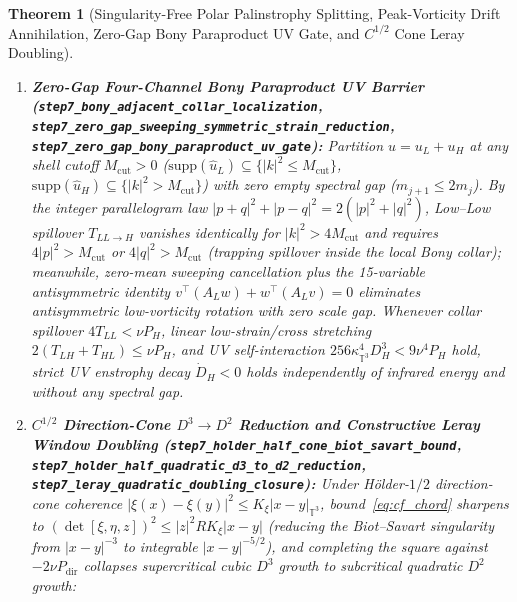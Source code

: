 \documentclass[11pt]{article}
\theoremstyle{plain}
\newtheorem{theorem}{Theorem}[section]
\theoremstyle{definition}
\begin{document}
\begin{theorem}[Singularity-Free Polar Palinstrophy Splitting, Peak-Vorticity Drift Annihilation, Zero-Gap Bony Paraproduct UV Gate, and $C^{1/2}$ Cone Leray Doubling]
\begin{enumerate}
  \begin{equation}\label{eq:polar_scissors}
    \dot{D}(t) \le \frac{2}{\sqrt{3}} c_{\mathrm{GN}} D(t)^{3/4} P_{\mathrm{amp}}(t)^{3/4} - 2\nu P_{\mathrm{amp}}(t) - 2\nu P_{\mathrm{dir}}(t) \le \frac{3 c_{\mathrm{GN}}^4}{128\nu^3}\bigl(1 - \Phi_{\mathrm{dir}}(t)\bigr)^3 D(t)^3 - 2\nu P_{\mathrm{dir}}(t).
  \end{equation}
  In particular, constant-modulus Beltrami flows ($\Phi_{\mathrm{dir}} = 1$) satisfy $(1 - \Phi_{\mathrm{dir}})^3 = 0$, while gapless 3D cascades with $\Phi_{\mathrm{dir}} \in [0.6644, 0.6728]$ widen the Moving Palinstrophy Ceiling by $(1 - \Phi_{\mathrm{dir}})^{-3} \in [26.47\times, \, 28.56\times]$.
  \item \textbf{Zero-Gap Four-Channel Bony Paraproduct UV Barrier (\texttt{step7\_bony\_\allowbreak adjacent\_\allowbreak collar\_\allowbreak localization}, \texttt{step7\_zero\_gap\_\allowbreak sweeping\_\allowbreak symmetric\_\allowbreak strain\_reduction}, \texttt{step7\_zero\_gap\_\allowbreak bony\_\allowbreak paraproduct\_\allowbreak uv\_gate}):} Partition $u = u_L + u_H$ at \emph{any} shell cutoff $M_{\mathrm{cut}} > 0$ ($\mathrm{supp}(\hat{u}_L) \subseteq \{|k|^2 \le M_{\mathrm{cut}}\}$, $\mathrm{supp}(\hat{u}_H) \subseteq \{|k|^2 > M_{\mathrm{cut}}\}$) with \emph{zero empty spectral gap} ($m_{j+1} \le 2 m_j$). By the integer parallelogram law $|p+q|^2 + |p-q|^2 = 2(|p|^2 + |q|^2)$, Low--Low spillover $T_{LL\to H}$ vanishes identically for $|k|^2 > 4 M_{\mathrm{cut}}$ and requires $4|p|^2 > M_{\mathrm{cut}}$ or $4|q|^2 > M_{\mathrm{cut}}$ (trapping spillover inside the local Bony collar); meanwhile, zero-mean sweeping cancellation plus the 15-variable antisymmetric identity $v^\top(A_L w) + w^\top(A_L v) = 0$ eliminates antisymmetric low-vorticity rotation with zero scale gap. Whenever collar spillover $4 T_{LL} < \nu P_H$, linear low-strain/cross stretching $2(T_{LH} + T_{HL}) \le \nu P_H$, and UV self-interaction $256\kappa_{\mathbb{T}^3}^4 D_H^3 < 9\nu^4 P_H$ hold, strict UV enstrophy decay $\dot{D}_H < 0$ holds independently of infrared energy and without any spectral gap.
  \item \textbf{$C^{1/2}$ Direction-Cone $D^3 \to D^2$ Reduction and Constructive Leray Window Doubling (\texttt{step7\_holder\_\allowbreak half\_cone\_\allowbreak biot\_savart\_bound}, \texttt{step7\_holder\_half\_\allowbreak quadratic\_\allowbreak d3\_to\_d2\_\allowbreak reduction}, \texttt{step7\_leray\_\allowbreak quadratic\_\allowbreak doubling\_\allowbreak closure}):} Under H\"older-$1/2$ direction-cone coherence $|\xi(x) - \xi(y)|^2 \le K_\xi |x - y|_{\mathbb{T}^3}$, bound~\eqref{eq:cf_chord} sharpens to $(\det[\xi,\eta,z])^2 \le |z|^2 R K_\xi |x - y|$ (reducing the Biot--Savart singularity from $|x-y|^{-3}$ to integrable $|x-y|^{-5/2}$), and completing the square against $-2\nu P_{\mathrm{dir}}$ collapses supercritical cubic $D^3$ growth to subcritical quadratic $D^2$ growth:

\end{enumerate}
\end{theorem}
\end{document}
